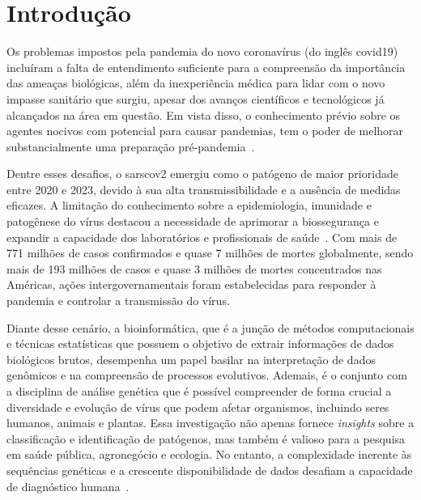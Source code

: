 
\chapter{Introdução}

\setlength{\parskip}{0.3cm}

Os problemas impostos pela pandemia do novo coronavírus (do inglês \gls{covid19}) incluíram a falta de entendimento suficiente para a compreensão da importância das ameaças biológicas, além da inexperiência médica para lidar com o novo impasse sanitário que surgiu, apesar dos avanços científicos e tecnológicos já alcançados na área em questão\cite{coronavirus_binsfeld_2020}. Em vista disso, o conhecimento prévio sobre os agentes nocivos com potencial para causar pandemias, tem o poder de melhorar substancialmente uma preparação pré-pandemia~\cite{behl_threat_2022}.

Dentre esses desafios, o \gls{sarscov2} emergiu como o patógeno de maior prioridade entre 2020 e 2023, devido à sua alta transmissibilidade e a ausência de medidas eficazes. A limitação do conhecimento sobre a epidemiologia, imunidade e patogênese do vírus destacou a necessidade de aprimorar a biossegurança e expandir a capacidade dos laboratórios e profissionais de saúde~\cite{sarscov2_covidsurg_2021,sarscov2_deigin_2021, multiple_kuchipudi_2022, efficacy_madhi_2021}. Com mais de 771 milhões de casos confirmados e quase 7 milhões de mortes globalmente, sendo mais de 193 milhões de casos e quase 3 milhões de mortes concentrados nas Américas\cite{who_covid19}, ações intergovernamentais foram estabelecidas para responder à pandemia e controlar a transmissão do vírus.

Diante desse cenário, a bioinformática, que é a junção de métodos computacionais e técnicas estatísticas que possuem o objetivo de extrair informações de dados biológicos brutos, desempenha um papel basilar na interpretação de dados genômicos e na compreensão de processos evolutivos\cite{herramientas_gonzales_2016}. Ademais, é o conjunto com a disciplina de análise genética que é possível compreender de forma crucial a diversidade e evolução de vírus que podem afetar organismos, incluindo seres humanos, animais e plantas. Essa investigação não apenas fornece \textit{insights} sobre a classificação e identificação de patógenos, mas também é valioso para a pesquisa em saúde pública, agronegócio e ecologia. No entanto, a complexidade inerente às sequências genéticas e a crescente disponibilidade de dados desafiam a capacidade de diagnóstico humana~\cite{virology_edward_2007, diversidade_flores_2000}.

